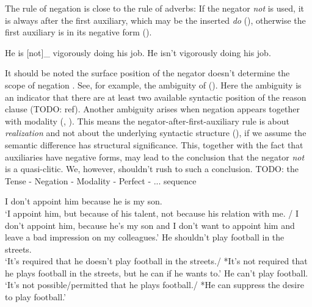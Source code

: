 \documentclass[UTF8, a4paper, oneside, scheme=plain]{ctexrep}
\newcommand*{\citepage}[1]{pp.~{#1}}
\newcommand{\corpus}[1]{\emph{#1}}
\newcommand{\translate}[1]{`#1'}
\begin{document}
The rule of negation is close to the rule of adverbs: 
If the negator \corpus{not} is used, it is always after the first auxiliary, 
which may be the inserted \corpus{do} (),
otherwise the first auxiliary is in its negative form ().

\begin{exe}
    \ex\label{ex:auxiliary-chain-breaking-2}
    He is [not]_{} vigorously doing his job.
    \ex\label{ex:auxiliary-chain-breaking-3}
    He isn't vigorously doing his job.
\end{exe}

It should be noted the surface position of the negator doesn't determine the scope of negation
\citep[\citepage{668}]{cgel}.
See, for example, the ambiguity of ().
Here the ambiguity is an indicator that 
there are at least two available syntactic position of the reason clause (TODO: ref).
Another ambiguity arises when negation appears together with modality
(, ).
This means the negator-after-first-auxiliary rule is about \emph{realization} 
and not about the underlying syntactic structure (),
if we assume the semantic difference has structural significance.
This, together with the fact that auxiliaries have negative forms,
may lead to the conclusion that the negator \corpus{not} is a quasi-clitic.
We, however, shouldn't rush to such a conclusion.
TODO: the Tense - Negation - Modality - Perfect - ... sequence

\begin{exe} 
    \ex\label{ex:verb-inflection.negation-ambiguity-1} 
    I don't appoint him because he is my son. \\
    \translate{I appoint him, but because of his talent, not because his relation with me. / 
    I don't appoint him, because he's my son and I don't want to appoint him and  
    leave a bad impression on my colleagues.}
    \ex\label{ex:verb-inflection.negation-ambiguity-2}
    He shouldn't play football in the streets. \\
    \translate{It's required that he doesn't play football in the streets./
    *It's not required that he plays football in the streets,
    but he can if he wants to.} 
    \ex\label{ex:verb-inflection.negation-ambiguity-3}
    He can't play football. \\
    \translate{It's not possible/permitted that he plays football./
    *He can suppress the desire to play football.}
\end{exe}   
\end{document}
